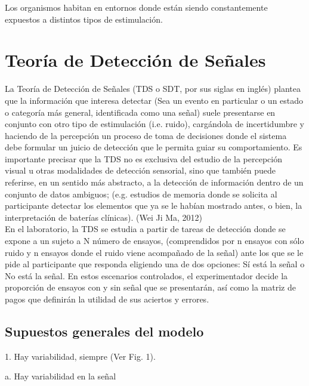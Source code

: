 Los organismos habitan en entornos donde están siendo constantemente expuestos a distintos tipos de estimulación. 





\section{Teoría de Detección de Señales}

La Teoría de Detección de Señales (TDS o SDT, por sus siglas en inglés) plantea que la información que  interesa  detectar  (Sea un evento en particular o un estado o categoría más general, identificada como una señal)  suele  presentarse  en  conjunto  con  otro  tipo  de  estimulación (i.e. ruido),  cargándola  de  incertidumbre  y  haciendo de  la  percepción  un  proceso  de  toma  de decisiones  donde  el  sistema  debe  formular  un  juicio  de  detección que  le  permita  guiar  su comportamiento. Es importante precisar  que la TDS no es exclusiva del estudio de la percepción visual  u  otras  modalidades  de  detección  sensorial,  sino  que  también  puede  referirse,  en  un sentido más abstracto, a la detección de información dentro de un conjunto de datos ambiguos; (e.g.  estudios  de  memoria  donde  se  solicita  al  participante  detectar  los  elementos  que  ya  se  le habían mostrado antes, o bien, la interpretación de baterías clínicas). (Wei Ji Ma, 2012)\\

En el laboratorio, la  TDS se estudia a partir  de tareas de detección donde se expone a un  sujeto  a  N  número  de  ensayos,  (comprendidos  por  n  ensayos con  sólo  ruido  y  n  ensayos donde  el  ruido  viene  acompañado  de  la  señal)  ante  los  que  se  le  pide  al  participante  que responda eligiendo una de dos opciones: Sí está la señal o No está la señal. En estos escenarios controlados,  el  experimentador  decide  la  proporción  de  ensayos  con  y  sin  señal  que  se presentarán, así como la matriz de pagos que definirán la utilidad de sus aciertos y errores. \\


\subsection{Supuestos generales del modelo}


1.	Hay variabilidad, siempre (Ver Fig. 1).

a.	Hay variabilidad en la señal

